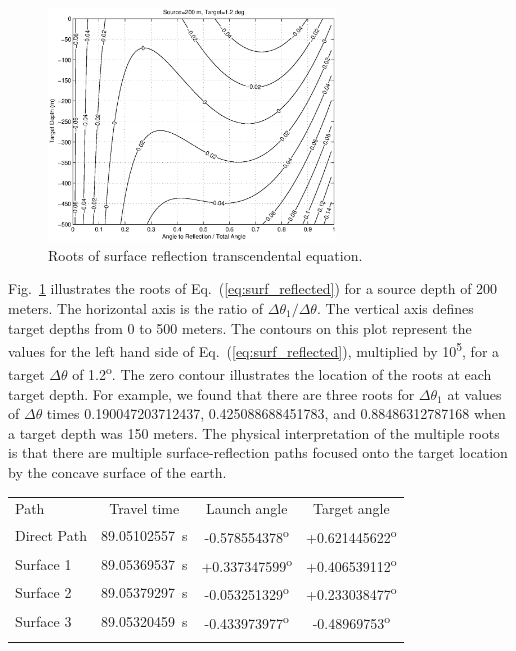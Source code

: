 \documentclass{ws-jca}
\begin{document}
\begin{figure}[th]
	\centerline{\includegraphics[width=3in]{eigenray_lloyds_analytic.eps}} 
	\vspace*{8pt}
	\caption{Roots of surface reflection transcendental equation.  
	\label{fig:eigenray_lloyds_analytic}}
\end{figure}
Fig.~\ref{fig:eigenray_lloyds_analytic} illustrates the roots of
Eq.~(\ref{eq:surf_reflected}) for a source depth of 200 meters. The horizontal
axis is the ratio of \(\Delta \theta_1 / \Delta \theta \). The vertical
axis defines target depths from 0 to 500 meters. The contours on this plot
represent the values for the left hand side of
Eq.~(\ref{eq:surf_reflected}), multiplied by 10\textsuperscript{5}, for a target
\(\Delta \theta\) of 1.2\textsuperscript{o}. The zero contour illustrates
the location of the roots at each target depth. For example, we found that
there are three roots for \(\Delta \theta_1\) at values of \(\Delta
\theta\) times 0.190047203712437, 0.425088688451783, and 0.88486312787168
when a target depth was 150 meters. The physical interpretation of the
multiple roots is that there are multiple surface-reflection paths focused
onto the target location by the concave surface of the earth.

\begin{table}[th]
	{\begin{tabular}{@{}lccc@{}} \toprule
		Path & Travel time& Launch angle & Target angle\\ \colrule
		Direct Path & 89.05102557~s & -0.578554378\textsuperscript{o} 
			& +0.621445622\textsuperscript{o} \\
		Surface 1 & 89.05369537~s & +0.337347599\textsuperscript{o} 
			& +0.406539112\textsuperscript{o} \\
		Surface 2 & 89.05379297~s & -0.053251329\textsuperscript{o} 
			& +0.233038477\textsuperscript{o} \\
		Surface 3 & 89.05320459~s & -0.433973977\textsuperscript{o} 
			& -0.48969753\textsuperscript{o} \\  \botrule
	\end{tabular}}
\end{table}
\end{document}
